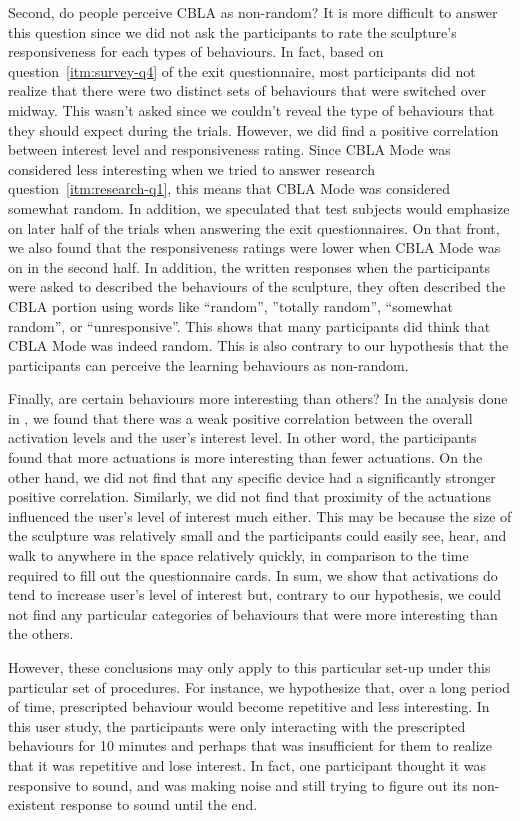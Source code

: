 Second, do people perceive CBLA as non-random? It is more difficult to answer this question since we did not ask the participants to rate the sculpture's responsiveness for each types of behaviours. In fact, based on question~\ref{itm:survey-q4} of the exit questionnaire, most participants did not realize that there were two distinct sets of behaviours that were switched over midway. This wasn't asked since we couldn't reveal the type of behaviours that they should expect during the trials. However, we did find a positive correlation between interest level and responsiveness rating. Since CBLA Mode was considered less interesting when we tried to answer research question~\ref{itm:research-q1},  this means that CBLA Mode was considered somewhat random. In addition, we speculated that test subjects would emphasize on later half of the trials when answering the exit questionnaires. On that front, we also found that the responsiveness ratings were lower when CBLA Mode was on in the second half. In addition, the written responses when the participants were asked to described the behaviours of the sculpture, they often described the CBLA portion using words like ``random'', ''totally random'', ``somewhat random'', or ``unresponsive''. This shows that many participants did think that CBLA Mode was indeed random. This is also contrary to our hypothesis that the participants can perceive the learning behaviours as non-random.

Finally, are certain behaviours more interesting than others? In the analysis done in , we found that there was a weak positive correlation between the overall activation levels and the user's interest level. In other word, the participants found that more actuations is more interesting than fewer actuations. On the other hand, we did not find that any specific device had a significantly stronger positive correlation. Similarly, we did not find that proximity of the actuations influenced the user's level of interest much either. This may be because the size of the sculpture was relatively small and the participants could easily see, hear, and walk to anywhere in the space relatively quickly, in comparison to the time required to fill out the questionnaire cards. In sum, we show that activations do tend to increase user's level of interest but, contrary to our hypothesis, we could not find any particular categories of behaviours that were more interesting than the others. 

However, these conclusions may only apply to this particular set-up under this particular set of procedures. For instance, we hypothesize that, over a long period of time, prescripted behaviour would become repetitive and less interesting. In this user study, the participants were only interacting with the prescripted behaviours for 10 minutes and perhaps that was insufficient for them to realize that it was repetitive and lose interest. In fact, one participant thought it was responsive to sound, and was making noise and still trying to figure out its non-existent response to sound until the end. 

